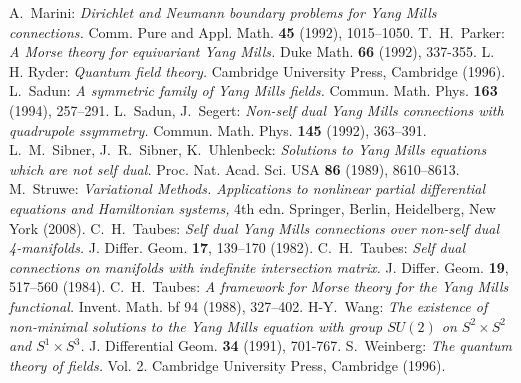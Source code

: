 \documentclass[11pt]{article}
\numberwithin{equation}{section} \setlength{\topmargin}{-35pt}
\begin{document}
\begin{thebibliography}{99}
A.~Marini: \emph{Dirichlet and Neumann boundary problems for Yang
Mills connections.} Comm. Pure and Appl. Math. {\bf 45} (1992),
1015--1050.
T.~H.~Parker: \emph{A Morse theory for equivariant Yang Mills.} Duke
Math. {\bf 66} (1992), 337-355.
L. H. Ryder: \emph{Quantum field theory.} Cambridge University
Press, Cambridge (1996).
L.~Sadun: \emph{A symmetric family of Yang Mills fields.} Commun.
Math. Phys. {\bf 163} (1994), 257--291.
L.~Sadun, J.~Segert: \emph{Non-self dual Yang Mills connections with
quadrupole ssymmetry.} Commun. Math. Phys. {\bf 145} (1992),
363--391.
L.~M.~Sibner, J.~R.~Sibner, K.~Uhlenbeck: \emph{Solutions to Yang
Mills equations which are not self dual.} Proc. Nat. Acad. Sci. USA
{\bf 86} (1989), 8610--8613.
M.~Struwe: \textit{Variational Methods. Applications to nonlinear
partial differential equations and Hamiltonian systems,} 4th edn.
Springer, Berlin, Heidelberg, New York (2008).
C.~H.~Taubes: \emph{Self dual Yang Mills connections over non-self
dual 4-manifolds.} J. Differ. Geom. {\bf 17}, 139--170 (1982).
C.~H.~Taubes: \emph{Self dual connections on manifolds with
indefinite intersection matrix.} J. Differ. Geom. {\bf 19}, 517--560
(1984).
C.~H.~Taubes: \emph{A framework for Morse theory for the Yang Mills
functional.} Invent. Math. {bf 94} (1988), 327--402.
H-Y.~Wang: \emph{The existence of non-minimal solutions to the Yang
Mills equation with group $SU(2)$ on $S^2\times S^2$ and $S^1\times
S^3$.} J. Differential Geom. {\bf 34} (1991), 701-767.
S.~Weinberg: \emph{The quantum theory of fields.} Vol. 2.  Cambridge
University Press, Cambridge (1996).
\end{thebibliography}
\end{document}
